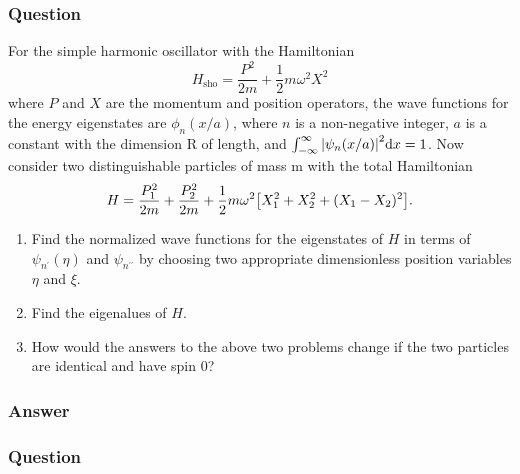 \subsubsection{Question}

For the simple harmonic oscillator with the Hamiltonian
\begin{equation*}
	H_{\text{sho}} = \frac{P^2}{2m} + \frac{1}{2}m\omega^2 X^2 
\end{equation*}
where $P$ and $X$ are the momentum and position operators, the wave functions for the energy eigenstates are $\phi_n(x/a)$, where $n$ is a non-negative integer, $a$ is a constant with the dimension R of length, and $\int_{-\infty}^{\infty}\abs{\psi_{n}(x/a)}^2\dd x =1$. Now consider two distinguishable particles of mass m with the total Hamiltonian
\begin{equation*}
	H = \frac{P_1^2}{2m}+\frac{P_2^2}{2m} + \frac{1}{2}m\omega^2\qty[X_1^2+X_2^2+(X_1-X_2)^2].
\end{equation*}
\begin{enumerate}
	\item Find the normalized wave functions for the eigenstates of $H$ in terms of $\psi_{n^\prime}(\eta)$ and $\psi_{n^{\prime\prime}}$ by choosing two appropriate dimensionless position variables $\eta$ and $\xi$.
	\item Find the eigenalues of $H$.
	\item How would the answers to the above two problems change if the two particles are identical and have spin 0?
\end{enumerate}

\subsubsection{Answer}


\subsubsection{Question}

